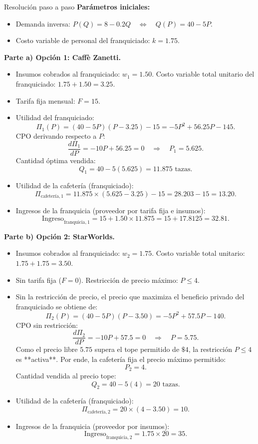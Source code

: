 \documentclass[11pt,a4paper]{article}
\begin{document}
\begin{pauta}{Resolución paso a paso}
\textbf{Parámetros iniciales:}
\begin{itemize}[itemsep=2pt]
    \item Demanda inversa: \(P(Q) = 8 - 0.2Q \quad\Longleftrightarrow\quad Q(P) = 40 - 5P\).
    \item Costo variable de personal del franquiciado: \(k = 1.75\).
\end{itemize}

\textbf{Parte a) Opción 1: Caffè Zanetti.}
\begin{itemize}[itemsep=2pt]
    \item Insumos cobrados al franquiciado: \(w_1 = 1.50\). Costo variable total unitario del franquiciado: \(1.75 + 1.50 = 3.25\).
    \item Tarifa fija mensual: \(F = 15\).
    \item Utilidad del franquiciado:
    \[
    \Pi_1(P) = (40 - 5P)(P - 3.25) - 15 = -5P^2 + 56.25P - 145.
    \]
    CPO derivando respecto a \(P\):
    \[
    \frac{d\Pi_1}{dP} = -10P + 56.25 = 0 \quad\Rightarrow\quad \boxed{P_1 = 5.625.}
    \]
    Cantidad óptima vendida:
    \[
    Q_1 = 40 - 5(5.625) = \boxed{11.875\text{ tazas.}}
    \]
    \item Utilidad de la cafetería (franquiciado):
    \[
    \Pi_{\text{cafetería},1} = 11.875 \times (5.625 - 3.25) - 15 = 28.203 - 15 = \boxed{13.20.}
    \]
    \item Ingresos de la franquicia (proveedor por tarifa fija e insumos):
    \[
    \text{Ingreso}_{\text{franquicia},1} = 15 + 1.50 \times 11.875 = 15 + 17.8125 = \boxed{32.81.}
    \]
\end{itemize}

\textbf{Parte b) Opción 2: StarWorlds.}
\begin{itemize}[itemsep=2pt]
    \item Insumos cobrados al franquiciado: \(w_2 = 1.75\). Costo variable total unitario: \(1.75 + 1.75 = 3.50\).
    \item Sin tarifa fija (\(F = 0\)). Restricción de precio máximo: \(P \le 4\).
    \item Sin la restricción de precio, el precio que maximiza el beneficio privado del franquiciado se obtiene de:
    \[
    \Pi_2(P) = (40 - 5P)(P - 3.50) = -5P^2 + 57.5P - 140.
    \]
    CPO sin restricción:
    \[
    \frac{d\Pi_2}{dP} = -10P + 57.5 = 0 \quad\Rightarrow\quad P = 5.75.
    \]
    Como el precio libre \(5.75\) supera el tope permitido de \(\$4\), la restricción \(P \le 4\) es **activa**. Por ende, la cafetería fija el precio máximo permitido:
    \[
    \boxed{P_2 = 4.}
    \]
    Cantidad vendida al precio tope:
    \[
    Q_2 = 40 - 5(4) = \boxed{20\text{ tazas.}}
    \]
    \item Utilidad de la cafetería (franquiciado):
    \[
    \Pi_{\text{cafetería},2} = 20 \times (4 - 3.50) = \boxed{10.}
    \]
    \item Ingresos de la franquicia (proveedor por insumos):
    \[
    \text{Ingreso}_{\text{franquicia},2} = 1.75 \times 20 = \boxed{35.}
    \]
\end{itemize}


\end{pauta}
\end{document}
